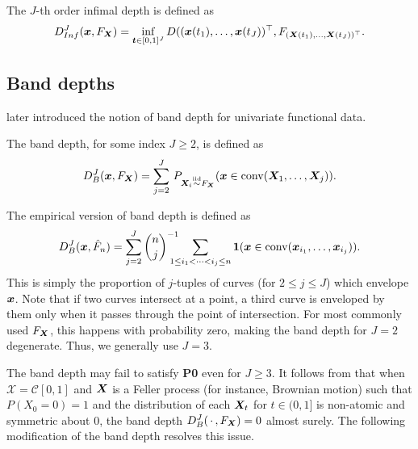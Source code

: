\begin{definition} \label{def:J_Inf_depth}
    The $J$-th order infimal depth is defined as
    \begin{equation}
        D_{Inf}^J(\bm{x}, F_{\bm{X}}) = \inf_{\bm{t} \in [0, 1]^J} D((\bm{x}(t_1), \dots, \bm{x}(t_J))^\top, F_{(\bm{X}(t_1), \dots, \bm{X}(t_J))^\top}.
    \end{equation}
\end{definition}

\subsection{Band depths}

\textcite{pintado-romo-2009} later introduced the notion of band depth for
univariate functional data.

\begin{definition}
    The band depth, for some index $J \geq 2$, is defined as
    \begin{equation}
        D_B^J(\bm{x}, F_{\bm{X}}) = \sum_{j = 2}^J\, P_{\bm{X}_i \overset{\text{iid}}{\sim} F_{\bm{X}}}(\bm{x} \in \operatorname{conv}(\bm{X}_1, \dots, \bm{X}_j)).
    \end{equation}
\end{definition}
The empirical version of band depth is defined as
\begin{equation}
    D_B^J(\bm{x}, \hat{F}_n) = \sum_{j = 2}^J\binom{n}{j}^{-1} \hspace{-1em}\sum_{\substack{1 \leq i_1 < \dots < i_j \leq n}} \bm{1}(\bm{x} \in \operatorname{conv}(\bm{x}_{i_1}, \dots, \bm{x}_{i_j})).
\end{equation}
This is simply the proportion of $j$-tuples of curves (for $2 \leq j \leq J$)
which envelope $\bm{x}$.
Note that if two curves intersect at a point, a third curve is enveloped by
them only when it passes through the point of intersection.
For most commonly used $F_{\bm{X}}$, this happens with probability zero, making
the band depth for $J = 2$ degenerate.
Thus, we generally use $J = 3$.


\begin{remark}
    The band depth may fail to satisfy \textbf{P0} even for $J \geq 3$.
    It follows from \textcite[Theorem~3.2]{chakraborty-chaudhuri-2014a} that
    when $\mathscr{X} = \mathcal{C}[0, 1]$ and $\bm{X}$ is a Feller process (for
    instance, Brownian motion) such that $P(X_0 = 0) = 1$ and the distribution
    of each $\bm{X}_t$ for $t \in (0, 1]$ is non-atomic and symmetric about $0$,
    the band depth $D^J_B(\,\cdot\,, F_{\bm{X}}) = 0$ almost surely.
    The following modification of the band depth resolves this issue.
\end{remark}


